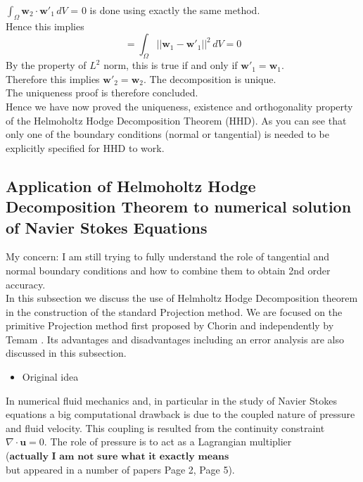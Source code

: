 $\int_{\Omega} \textbf{w}_2 \cdot \textbf{w}'_1 \, dV$ = 0 is done using exactly the same method.\\
Hence this implies
\begin{dmath}
= \int_{\Omega} || \textbf{w}_1 - \textbf{w}'_1 ||^2 \, dV = 0
\end{dmath}
By the property of $\textit{L}^2$ norm, this is true if and only if $\textbf{w}'_1 = \textbf{w}_1$.\\
Therefore this implies $\textbf{w}'_2 = \textbf{w}_2$. The decomposition is unique.\\
The uniqueness proof is therefore concluded.\\

Hence we have now proved the uniqueness, existence and orthogonality property of the Helmoholtz Hodge Decomposition Theorem (HHD). As you can see that only one of the boundary conditions (normal or tangential) is needed to be explicitly specified for HHD to work.

\newpage
\subsection{Application of Helmoholtz Hodge Decomposition Theorem to numerical solution of Navier Stokes Equations}

My concern: I am still trying to fully understand the role of tangential and normal boundary conditions and how to combine them to obtain 2nd order accuracy.\\

In this subsection we discuss the use of Helmholtz Hodge Decomposition theorem in the construction of the standard Projection method. We are focused on the primitive Projection method first proposed by Chorin and independently by Temam \cite{chorin1968numerical,temam1969approximation,brown2001accurate}. Its advantages and disadvantages including an error analysis are also discussed in this subsection.\\

\begin{itemize}
\item Original idea\\
\end{itemize}
In numerical fluid mechanics and, in particular in the study of Navier Stokes equations a big computational drawback is due to the coupled nature of pressure and fluid velocity. This coupling is resulted from the continuity constraint $\nabla \cdot \textbf{u} = 0$. The role of pressure is to act as a Lagrangian multiplier \cite{maria2003application,perot1993analysis}\\
($\textbf{actually I am not sure what it exactly means}$\\
 but appeared in a number of papers \cite{maria2003application} Page 2, \cite{perot1993analysis} Page 5).\\

